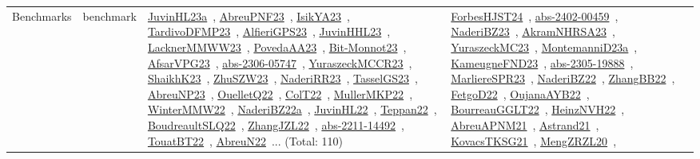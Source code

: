 {\begin{longtable}{lp{3cm}>{\raggedright\arraybackslash}p{6cm}>{\raggedright\arraybackslash}p{6cm}>{\raggedright\arraybackslash}p{8cm}}
Benchmarks & benchmark & \href{../works/JuvinHL23a.pdf}{JuvinHL23a}~\cite{JuvinHL23a}, \href{../works/AbreuPNF23.pdf}{AbreuPNF23}~\cite{AbreuPNF23}, \href{../works/IsikYA23.pdf}{IsikYA23}~\cite{IsikYA23}, \href{../works/TardivoDFMP23.pdf}{TardivoDFMP23}~\cite{TardivoDFMP23}, \href{../works/AlfieriGPS23.pdf}{AlfieriGPS23}~\cite{AlfieriGPS23}, \href{../works/JuvinHHL23.pdf}{JuvinHHL23}~\cite{JuvinHHL23}, \href{../works/LacknerMMWW23.pdf}{LacknerMMWW23}~\cite{LacknerMMWW23}, \href{../works/PovedaAA23.pdf}{PovedaAA23}~\cite{PovedaAA23}, \href{../works/Bit-Monnot23.pdf}{Bit-Monnot23}~\cite{Bit-Monnot23}, \href{../works/AfsarVPG23.pdf}{AfsarVPG23}~\cite{AfsarVPG23}, \href{../works/abs-2306-05747.pdf}{abs-2306-05747}~\cite{abs-2306-05747}, \href{../works/YuraszeckMCCR23.pdf}{YuraszeckMCCR23}~\cite{YuraszeckMCCR23}, \href{../works/ShaikhK23.pdf}{ShaikhK23}~\cite{ShaikhK23}, \href{../works/ZhuSZW23.pdf}{ZhuSZW23}~\cite{ZhuSZW23}, \href{../works/NaderiRR23.pdf}{NaderiRR23}~\cite{NaderiRR23}, \href{../works/TasselGS23.pdf}{TasselGS23}~\cite{TasselGS23}, \href{../works/AbreuNP23.pdf}{AbreuNP23}~\cite{AbreuNP23}, \href{../works/OuelletQ22.pdf}{OuelletQ22}~\cite{OuelletQ22}, \href{../works/ColT22.pdf}{ColT22}~\cite{ColT22}, \href{../works/MullerMKP22.pdf}{MullerMKP22}~\cite{MullerMKP22}, \href{../works/WinterMMW22.pdf}{WinterMMW22}~\cite{WinterMMW22}, \href{../works/NaderiBZ22a.pdf}{NaderiBZ22a}~\cite{NaderiBZ22a}, \href{../works/JuvinHL22.pdf}{JuvinHL22}~\cite{JuvinHL22}, \href{../works/Teppan22.pdf}{Teppan22}~\cite{Teppan22}, \href{../works/BoudreaultSLQ22.pdf}{BoudreaultSLQ22}~\cite{BoudreaultSLQ22}, \href{../works/ZhangJZL22.pdf}{ZhangJZL22}~\cite{ZhangJZL22}, \href{../works/abs-2211-14492.pdf}{abs-2211-14492}~\cite{abs-2211-14492}, \href{../works/TouatBT22.pdf}{TouatBT22}~\cite{TouatBT22}, \href{../works/AbreuN22.pdf}{AbreuN22}~\cite{AbreuN22}... (Total: 110) & \href{../works/ForbesHJST24.pdf}{ForbesHJST24}~\cite{ForbesHJST24}, \href{../works/abs-2402-00459.pdf}{abs-2402-00459}~\cite{abs-2402-00459}, \href{../works/NaderiBZ23.pdf}{NaderiBZ23}~\cite{NaderiBZ23}, \href{../works/AkramNHRSA23.pdf}{AkramNHRSA23}~\cite{AkramNHRSA23}, \href{../works/YuraszeckMC23.pdf}{YuraszeckMC23}~\cite{YuraszeckMC23}, \href{../works/MontemanniD23a.pdf}{MontemanniD23a}~\cite{MontemanniD23a}, \href{../works/KameugneFND23.pdf}{KameugneFND23}~\cite{KameugneFND23}, \href{../works/abs-2305-19888.pdf}{abs-2305-19888}~\cite{abs-2305-19888}, \href{../works/MarliereSPR23.pdf}{MarliereSPR23}~\cite{MarliereSPR23}, \href{../works/NaderiBZ22.pdf}{NaderiBZ22}~\cite{NaderiBZ22}, \href{../works/ZhangBB22.pdf}{ZhangBB22}~\cite{ZhangBB22}, \href{../works/FetgoD22.pdf}{FetgoD22}~\cite{FetgoD22}, \href{../works/OujanaAYB22.pdf}{OujanaAYB22}~\cite{OujanaAYB22}, \href{../works/BourreauGGLT22.pdf}{BourreauGGLT22}~\cite{BourreauGGLT22}, \href{../works/HeinzNVH22.pdf}{HeinzNVH22}~\cite{HeinzNVH22}, \href{../works/AbreuAPNM21.pdf}{AbreuAPNM21}~\cite{AbreuAPNM21}, \href{../works/Astrand21.pdf}{Astrand21}~\cite{Astrand21}, \href{../works/KovacsTKSG21.pdf}{KovacsTKSG21}~\cite{KovacsTKSG21}, \href{../works/MengZRZL20.pdf}{MengZRZL20}~\cite{MengZRZL20}, 
\end{longtable}}
